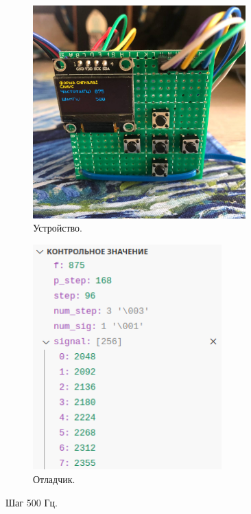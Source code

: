	\begin{figure}[H]
     \begin{subfigure}[H]{0.5\textwidth}
         \centering
         \includegraphics[width=0.9\textwidth]{../image/test3_u_f.jpg}
         \caption{Устройство.}
     \end{subfigure}
     \hfill
     \begin{subfigure}[H]{0.5\textwidth}
         \centering
         \includegraphics[width=0.8\textwidth]{../image/test3_o_f.png}
         \caption{Отладчик.}
     \end{subfigure}
        \caption{Шаг 500 Гц.}
	\end{figure}
	
